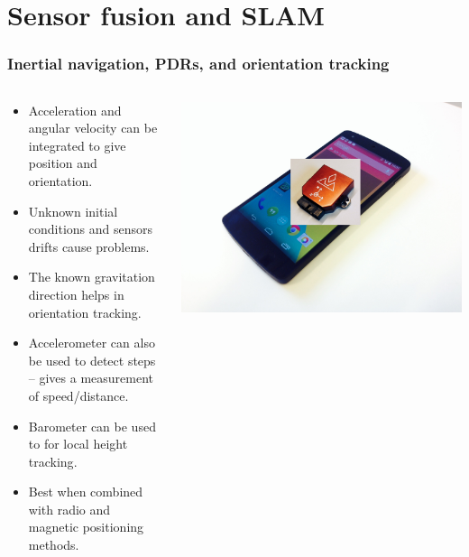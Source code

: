 \documentclass[xcolor=svgnames,english,presentation]{beamer}
\begin{document}
\section{Sensor fusion and SLAM}

\begin{frame}
  \frametitle{Inertial navigation, PDRs, and orientation tracking}

  \begin{columns}
  \begin{column}{0.6\textwidth}
  \begin{itemize}[<+->]       
  \item \alert{Acceleration and angular velocity} can be \alert{integrated} to give position and orientation.
  \item Unknown \alert{initial conditions and sensors drifts} cause problems.
  \item The \alert{known gravitation direction} helps in \alert{orientation tracking}.
  \item Accelerometer can also be used to \alert{detect steps} -- gives a measurement of \alert{speed/distance}.
  \item \alert{Barometer} can be used to for \alert{local height tracking}. 
  \item Best when \alert{combined} with \alert{radio and magnetic} positioning methods.
  \end{itemize}
  \end{column}
  \begin{column}{0.4\textwidth}
  \includegraphics[width=\columnwidth]{mobile2} \\

\end{column}
\end{columns}
\end{frame}
\end{document}
